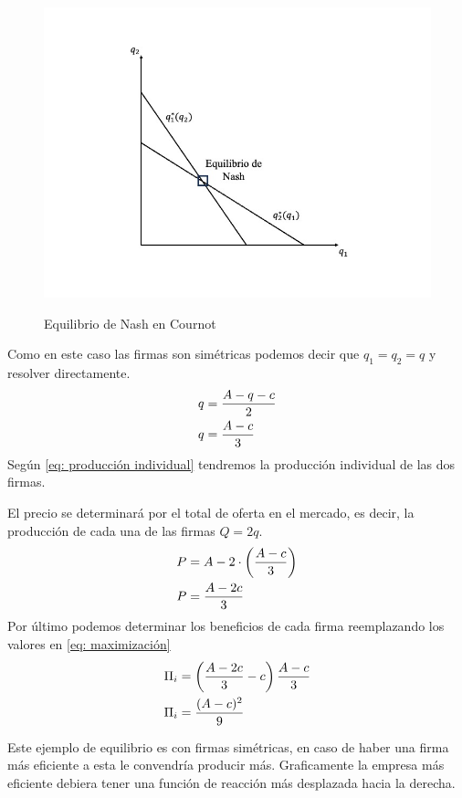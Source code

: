 \begin{figure}[htb]
    \centering
    \caption{Equilibrio de Nash en Cournot}
    \centering
    \includegraphics[width=12cm]{Figuras/EN Cournot.jpeg}
    \label{fig:EN Cournot}
\end{figure}

Como en este caso las firmas son simétricas podemos decir que $q_1 = q_2 = q$ y resolver directamente. 
\begin{align}
    q &= \frac{A-q-c}{2} \notag \\
    q &= \frac{A-c}{3} \label{eq: producción individual}
\end{align}
Según \ref{eq: producción individual} tendremos la producción individual de las dos firmas.

El precio se determinará por el total de oferta en el mercado, es decir, la producción de cada una de las firmas $Q = 2q$. 
\begin{align}
    P &= A-2 \cdot \left( \frac{A-c}{3} \right) \notag \\
    P &= \frac{A-2c}{3}
\end{align}
Por último podemos determinar los beneficios de cada firma reemplazando los valores en \ref{eq: maximización}
\begin{align}
\Pi_i &= \left(\frac{A-2c}{3}-c \right) \frac{A-c}{3} \notag \\ 
\Pi_i &= \frac{(A-c)^2}{9}
\end{align}

Este ejemplo de equilibrio es con firmas simétricas, en caso de haber una firma más eficiente a esta le convendría producir más. Graficamente la empresa más eficiente debiera tener una función de reacción más desplazada hacia la derecha. 


